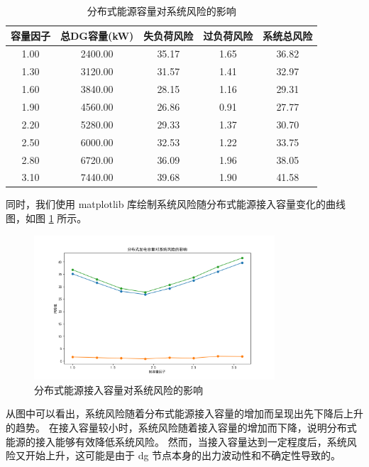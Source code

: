 \documentclass{article}
\begin{document}
\begin{table}[htbp]
  \centering
  \begin{tabular}{ccccc}
    \toprule
    容量因子 & 总DG容量(kW) & 失负荷风险 & 过负荷风险 & 系统总风险 \\
    \midrule
    1.00 & 2400.00 & 35.17 & 1.65 & 36.82 \\
    1.30 & 3120.00 & 31.57 & 1.41 & 32.97 \\
    1.60 & 3840.00 & 28.15 & 1.16 & 29.31 \\
    1.90 & 4560.00 & 26.86 & 0.91 & 27.77 \\
    2.20 & 5280.00 & 29.33 & 1.37 & 30.70 \\
    2.50 & 6000.00 & 32.53 & 1.22 & 33.75 \\
    2.80 & 6720.00 & 36.09 & 1.96 & 38.05 \\
    3.10 & 7440.00 & 39.68 & 1.90 & 41.58 \\
    \bottomrule
  \end{tabular}
  \caption{分布式能源容量对系统风险的影响}
  \label{tab:risk_evolution}
\end{table}

同时，我们使用 matplotlib 库绘制系统风险随分布式能源接入容量变化的曲线图，如图 \ref{fig:risk_evolution} 所示。

\begin{figure}[htbp]
  \centering
  \includegraphics[width=0.8\textwidth]{problem2/dg_capacity_trending.png}
  \caption{分布式能源接入容量对系统风险的影响}
  \label{fig:risk_evolution}
\end{figure}

从图中可以看出，系统风险随着分布式能源接入容量的增加而呈现出先下降后上升的趋势。
在接入容量较小时，系统风险随着接入容量的增加而下降，说明分布式能源的接入能够有效降低系统风险。
然而，当接入容量达到一定程度后，系统风险又开始上升，这可能是由于 dg 节点本身的出力波动性和不确定性导致的。
\end{document}
